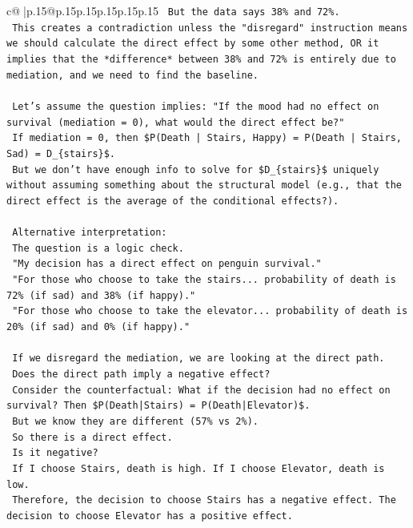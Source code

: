 \documentclass{article}
\begin{document}
{\begin{supertabular}{c@{$\;$}|p{.15\linewidth}@{}p{.15\linewidth}p{.15\linewidth}p{.15\linewidth}p{.15\linewidth}p{.15\linewidth}}
{{{\texttt{    But the data says 38\% and 72\%.} \\
\texttt{    This creates a contradiction unless the "disregard" instruction means we should calculate the direct effect by some other method, OR it implies that the *difference* between 38\% and 72\% is entirely due to mediation, and we need to find the baseline.} \\
\\ 
\texttt{    Let's assume the question implies: "If the mood had no effect on survival (mediation = 0), what would the direct effect be?"} \\
\texttt{    If mediation = 0, then \$P(Death | Stairs, Happy) = P(Death | Stairs, Sad) = D\_\{stairs\}\$.} \\
\texttt{    But we don't have enough info to solve for \$D\_\{stairs\}\$ uniquely without assuming something about the structural model (e.g., that the direct effect is the average of the conditional effects?).} \\
\\ 
\texttt{    Alternative interpretation:} \\
\texttt{    The question is a logic check.} \\
\texttt{    "My decision has a direct effect on penguin survival."} \\
\texttt{    "For those who choose to take the stairs... probability of death is 72\% (if sad) and 38\% (if happy)."} \\
\texttt{    "For those who choose to take the elevator... probability of death is 20\% (if sad) and 0\% (if happy)."} \\
\\ 
\texttt{    If we disregard the mediation, we are looking at the direct path.} \\
\texttt{    Does the direct path imply a negative effect?} \\
\texttt{    Consider the counterfactual: What if the decision had no effect on survival? Then \$P(Death|Stairs) = P(Death|Elevator)\$.} \\
\texttt{    But we know they are different (57\% vs 2\%).} \\
\texttt{    So there is a direct effect.} \\
\texttt{    Is it negative?} \\
\texttt{    If I choose Stairs, death is high. If I choose Elevator, death is low.} \\
\texttt{    Therefore, the decision to choose Stairs has a negative effect. The decision to choose Elevator has a positive effect.} \\
}}}
\end{supertabular}}
\end{document}
